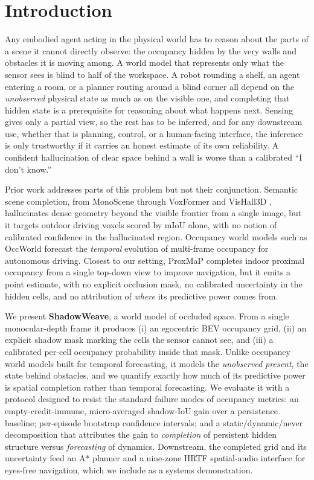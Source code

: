 \documentclass{article}
\begin{document}
\section{Introduction}
\label{sec:intro}

Any embodied agent acting in the physical world has to reason about the parts of a scene it cannot
directly observe: the occupancy hidden by the very walls and obstacles it is moving among. A world
model that represents only what the sensor sees is blind to half of the workspace. A robot rounding
a shelf, an agent entering a room, or a planner routing around a blind corner all depend on the
\emph{unobserved} physical state as much as on the visible one, and completing that hidden state is
a prerequisite for reasoning about what happens next. Sensing gives only a partial view, so the
rest has to be inferred, and for any downstream use, whether that is planning, control, or a
human-facing interface, the inference is only trustworthy if it carries an honest estimate of its
own reliability. A confident hallucination of clear space behind a wall is worse than a calibrated
``I don't know.''

Prior work addresses parts of this problem but not their conjunction. Semantic scene completion,
from MonoScene \citep{cao2022monoscene} through VoxFormer \citep{li2023voxformer} and
VisHall3D \citep{lu2025vishall3d}, hallucinates dense geometry beyond the visible frontier from a
single image, but it targets outdoor driving voxels scored by mIoU alone, with no notion of
calibrated confidence in the hallucinated region. Occupancy world models such as
OccWorld \citep{zheng2024occworld} forecast the \emph{temporal} evolution of multi-frame occupancy
for autonomous driving. Closest to our setting, ProxMaP \citep{sharma2023proxmap} completes indoor
proximal occupancy from a single top-down view to improve navigation, but it emits a point
estimate, with no explicit occlusion mask, no calibrated uncertainty in the hidden cells, and no
attribution of \emph{where} its predictive power comes from.

We present \textbf{ShadowWeave}, a world model of occluded space. From a single monocular-depth
frame it produces (i) an egocentric BEV occupancy grid, (ii) an explicit shadow mask marking the
cells the sensor cannot see, and (iii) a calibrated per-cell occupancy probability inside that
mask. Unlike occupancy world models built for temporal forecasting, it models the \emph{unobserved
present}, the state behind obstacles, and we quantify exactly how much of its predictive power is
spatial completion rather than temporal forecasting. We evaluate it with a protocol designed to
resist the standard failure modes of occupancy metrics: an empty-credit-immune, micro-averaged
shadow-IoU gain over a persistence baseline; per-episode bootstrap confidence intervals; and a
static/dynamic/never decomposition that attributes the gain to \emph{completion} of persistent
hidden structure versus \emph{forecasting} of dynamics. Downstream, the completed grid and its
uncertainty feed an A* planner and a nine-zone HRTF spatial-audio interface for eyes-free
navigation, which we include as a systems demonstration.
\end{document}
